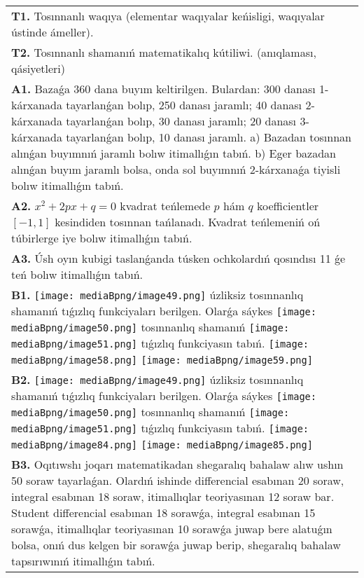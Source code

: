 \documentclass{article}
\begin{document}
\begin{tabular}{m{17cm}}
\textbf{T1.} Tosınnanlı waqıya (elementar waqıyalar keńisligi, waqıyalar ústinde ámeller).
 \\
\textbf{T2.} Tosınnanlı shamanıń matematikalıq kútiliwi. (anıqlaması, qásiyetleri)
 \\
\textbf{A1.} Bazaǵa 360 dana buyım keltirilgen. Bulardan: 300 danası 1-kárxanada tayarlanǵan bolıp, 250 danası jaramlı; 40 danası 2-kárxanada tayarlanǵan bolıp, 30 danası jaramlı; 20 danası 3-kárxanada tayarlanǵan bolıp, 10 danası jaramlı. a) Bazadan tosınnan alınǵan buyımnıń jaramlı bolıw itimallıǵın tabıń. b) Eger bazadan alınǵan buyım jaramlı bolsa, onda sol buyımnıń 2-kárxanaǵa tiyisli bolıw itimallıǵın tabıń.
 \\
\textbf{A2.} ${{x}^{2}}+2px+q=0$ kvadrat teńlemede $p$ hám $q$ koefficientler $\left[ -1,1 \right]$ kesindiden tosınnan tańlanadı. Kvadrat teńlemeniń oń túbirlerge iye bolıw itimallıǵın tabıń.
 \\
\textbf{A3.} Úsh oyın kubigi taslanǵanda túsken ochkolardıń qosındısı 11 ǵe teń bolıw itimallıǵın tabıń.
 \\
\textbf{B1.} \texttt{[image: mediaBpng/image49.png]} úzliksiz tosınnanlıq shamanıń tıǵızlıq funkciyaları berilgen. Olarǵa sáykes \texttt{[image: mediaBpng/image50.png]} tosınnanlıq shamanıń \texttt{[image: mediaBpng/image51.png]} tıǵızlıq funkciyasın tabıń. \texttt{[image: mediaBpng/image58.png]} \texttt{[image: mediaBpng/image59.png]}
 \\
\textbf{B2.} \texttt{[image: mediaBpng/image49.png]} úzliksiz tosınnanlıq shamanıń tıǵızlıq funkciyaları berilgen. Olarǵa sáykes \texttt{[image: mediaBpng/image50.png]} tosınnanlıq shamanıń \texttt{[image: mediaBpng/image51.png]} tıǵızlıq funkciyasın tabıń. \texttt{[image: mediaBpng/image84.png]} \texttt{[image: mediaBpng/image85.png]}
 \\
\textbf{B3.} Oqıtıwshı joqarı matematikadan shegaralıq bahalaw alıw ushın 50 soraw tayarlaǵan. Olardıń ishinde differencial esabınan 20 soraw, integral esabınan 18 soraw, itimallıqlar teoriyasınan 12 soraw bar. Student differencial esabınan 18 sorawǵa, integral esabınan 15 sorawǵa, itimallıqlar teoriyasınan 10 sorawǵa juwap bere alatuǵın bolsa, onıń dus kelgen bir sorawǵa juwap berip, shegaralıq bahalaw tapsırıwınıń itimallıǵın tabıń.

\end{tabular}
\end{document}
